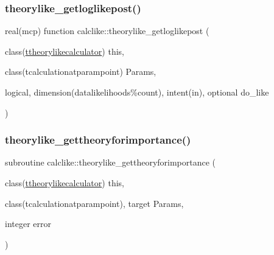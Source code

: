 \mbox{\label{namespacecalclike_a27e62cb96ad63d0285283d1eb8dcec0c}} 
\subsubsection{\texorpdfstring{theorylike\+\_\+getloglikepost()}{theorylike\_getloglikepost()}}
{\footnotesize\ttfamily real(mcp) function calclike\+::theorylike\+\_\+getloglikepost (\begin{DoxyParamCaption}\item[{class(\mbox{\hyperlink{structcalclike_1_1ttheorylikecalculator}{ttheorylikecalculator}})}]{this,  }\item[{class(tcalculationatparampoint)}]{Params,  }\item[{logical, dimension(datalikelihoods\%count), intent(in), optional}]{do\+\_\+like }\end{DoxyParamCaption})\hspace{0.3cm}{\ttfamily [private]}}

\mbox{\label{namespacecalclike_ab57c11043f079701db0baf858bf6315a}} 
\subsubsection{\texorpdfstring{theorylike\+\_\+gettheoryforimportance()}{theorylike\_gettheoryforimportance()}}
{\footnotesize\ttfamily subroutine calclike\+::theorylike\+\_\+gettheoryforimportance (\begin{DoxyParamCaption}\item[{class(\mbox{\hyperlink{structcalclike_1_1ttheorylikecalculator}{ttheorylikecalculator}})}]{this,  }\item[{class(tcalculationatparampoint), target}]{Params,  }\item[{integer}]{error }\end{DoxyParamCaption})\hspace{0.3cm}{\ttfamily [private]}}

\mbox{\label{namespacecalclike_ab2d52ca5a668e5072ed6d10c161a5e88}} 
